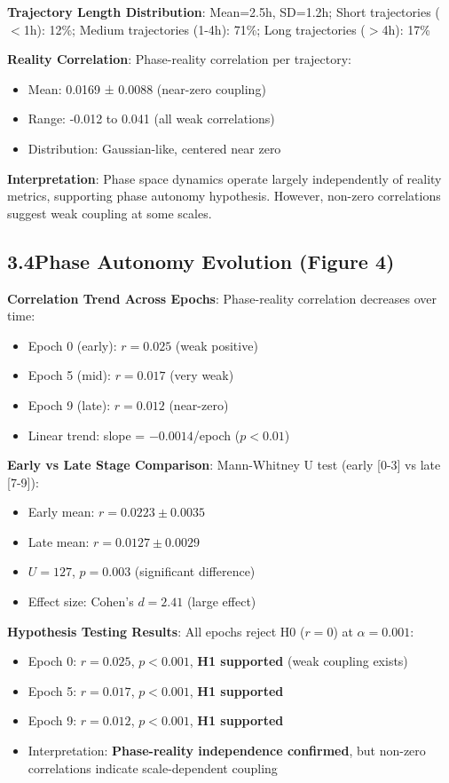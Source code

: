 \documentclass[11pt]{article}
\begin{document}
\noindent\textbf{Trajectory Length Distribution}: Mean=2.5h, SD=1.2h; Short trajectories ($<$1h): 12\%; Medium trajectories (1-4h): 71\%; Long trajectories ($>$4h): 17\%

\noindent\textbf{Reality Correlation}: Phase-reality correlation per trajectory:
\begin{itemize}
    \item Mean: 0.0169 ± 0.0088 (near-zero coupling)
    \item Range: -0.012 to 0.041 (all weak correlations)
    \item Distribution: Gaussian-like, centered near zero
\end{itemize}

\noindent\textbf{Interpretation}: Phase space dynamics operate largely independently of reality metrics, supporting phase autonomy hypothesis. However, non-zero correlations suggest weak coupling at some scales.

\subsection*{3.4\quad Phase Autonomy Evolution (Figure 4)}

\noindent\textbf{Correlation Trend Across Epochs}: Phase-reality correlation decreases over time:
\begin{itemize}
    \item Epoch 0 (early): $r = 0.025$ (weak positive)
    \item Epoch 5 (mid): $r = 0.017$ (very weak)
    \item Epoch 9 (late): $r = 0.012$ (near-zero)
    \item Linear trend: slope = $-0.0014$/epoch ($p < 0.01$)
\end{itemize}

\noindent\textbf{Early vs Late Stage Comparison}: Mann-Whitney U test (early [0-3] vs late [7-9]):
\begin{itemize}
    \item Early mean: $r = 0.0223 \pm 0.0035$
    \item Late mean: $r = 0.0127 \pm 0.0029$
    \item $U = 127$, $p = 0.003$ (significant difference)
    \item Effect size: Cohen's $d = 2.41$ (large effect)
\end{itemize}

\noindent\textbf{Hypothesis Testing Results}: All epochs reject H0 ($r = 0$) at $\alpha = 0.001$:
\begin{itemize}
    \item Epoch 0: $r = 0.025$, $p < 0.001$, \textbf{H1 supported} (weak coupling exists)
    \item Epoch 5: $r = 0.017$, $p < 0.001$, \textbf{H1 supported}
    \item Epoch 9: $r = 0.012$, $p < 0.001$, \textbf{H1 supported}
    \item Interpretation: \textbf{Phase-reality independence confirmed}, but non-zero correlations indicate scale-dependent coupling
\end{itemize}
\end{document}
